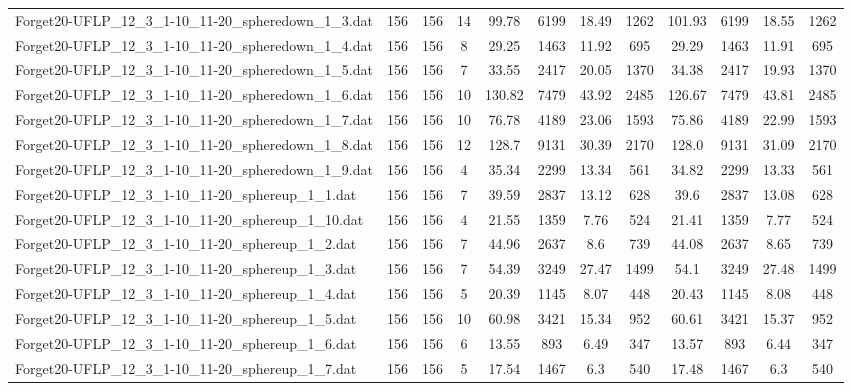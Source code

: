 \begin{sidewaystable}[!ht]
{\begin{tabular}{lccccccccccc}
Forget20-UFLP\_12\_3\_1-10\_11-20\_spheredown\_1\_3.dat & 156 & 156 & 14 & 99.78 & 6199 & 18.49 & 1262 & 101.93 & 6199 & 18.55 & 1262 \\
Forget20-UFLP\_12\_3\_1-10\_11-20\_spheredown\_1\_4.dat & 156 & 156 & 8 & 29.25 & 1463 & 11.92 & 695 & 29.29 & 1463 &  \textcolor{blue2}{11.91} & 695 \\
Forget20-UFLP\_12\_3\_1-10\_11-20\_spheredown\_1\_5.dat & 156 & 156 & 7 & 33.55 & 2417 & 20.05 & 1370 & 34.38 & 2417 &  \textcolor{blue2}{19.93} & 1370 \\
Forget20-UFLP\_12\_3\_1-10\_11-20\_spheredown\_1\_6.dat & 156 & 156 & 10 & 130.82 & 7479 & 43.92 & 2485 & 126.67 & 7479 &  \textcolor{blue2}{43.81} & 2485 \\
Forget20-UFLP\_12\_3\_1-10\_11-20\_spheredown\_1\_7.dat & 156 & 156 & 10 & 76.78 & 4189 & 23.06 & 1593 & 75.86 & 4189 &  \textcolor{blue2}{22.99} & 1593 \\
Forget20-UFLP\_12\_3\_1-10\_11-20\_spheredown\_1\_8.dat & 156 & 156 & 12 & 128.7 & 9131 & 30.39 & 2170 & 128.0 & 9131 & 31.09 & 2170 \\
Forget20-UFLP\_12\_3\_1-10\_11-20\_spheredown\_1\_9.dat & 156 & 156 & 4 & 35.34 & 2299 & 13.34 & 561 & 34.82 & 2299 &  \textcolor{blue2}{13.33} & 561 \\
Forget20-UFLP\_12\_3\_1-10\_11-20\_sphereup\_1\_1.dat & 156 & 156 & 7 & 39.59 & 2837 & 13.12 & 628 & 39.6 & 2837 & 13.08 & 628 \\
Forget20-UFLP\_12\_3\_1-10\_11-20\_sphereup\_1\_10.dat & 156 & 156 & 4 & 21.55 & 1359 &  \textcolor{blue2}{7.76} & 524 & 21.41 & 1359 & 7.77 & 524 \\
Forget20-UFLP\_12\_3\_1-10\_11-20\_sphereup\_1\_2.dat & 156 & 156 & 7 & 44.96 & 2637 &  \textcolor{blue2}{8.6} & 739 & 44.08 & 2637 & 8.65 & 739 \\
Forget20-UFLP\_12\_3\_1-10\_11-20\_sphereup\_1\_3.dat & 156 & 156 & 7 & 54.39 & 3249 & 27.47 & 1499 & 54.1 & 3249 & 27.48 & 1499 \\
Forget20-UFLP\_12\_3\_1-10\_11-20\_sphereup\_1\_4.dat & 156 & 156 & 5 & 20.39 & 1145 & 8.07 & 448 & 20.43 & 1145 & 8.08 & 448 \\
Forget20-UFLP\_12\_3\_1-10\_11-20\_sphereup\_1\_5.dat & 156 & 156 & 10 & 60.98 & 3421 & 15.34 & 952 & 60.61 & 3421 & 15.37 & 952 \\
Forget20-UFLP\_12\_3\_1-10\_11-20\_sphereup\_1\_6.dat & 156 & 156 & 6 & 13.55 & 893 & 6.49 & 347 & 13.57 & 893 &  \textcolor{blue2}{6.44} & 347 \\
Forget20-UFLP\_12\_3\_1-10\_11-20\_sphereup\_1\_7.dat & 156 & 156 & 5 & 17.54 & 1467 &  \textcolor{blue2}{6.3} & 540 & 17.48 & 1467 &  \textcolor{blue2}{6.3} & 540 \\

\end{tabular}}
\end{sidewaystable}

